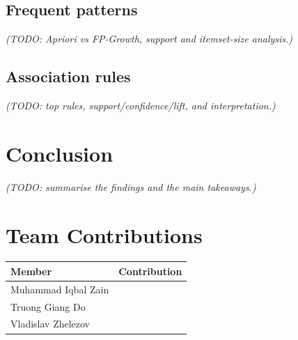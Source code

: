 \documentclass[11pt,a4paper]{article}
\numberwithin{table}{section}
\numberwithin{figure}{section}
\newcommand{\memberA}{Muhammad Iqbal Zain}
\newcommand{\memberB}{Truong Giang Do}
\newcommand{\memberC}{Vladislav Zhelezov}
\begin{document}
\subsection{Frequent patterns}
\emph{(TODO: Apriori vs FP-Growth, support and itemset-size analysis.)}

\subsection{Association rules}
\emph{(TODO: top rules, support/confidence/lift, and interpretation.)}

\section{Conclusion}
\label{sec:conclusion}
\emph{(TODO: summarise the findings and the main takeaways.)}

\section*{Team Contributions}
\label{sec:contributions}
\begin{table}[h]
  \centering
  \small
  \begin{tabularx}{\columnwidth}{l X}
    \toprule
    Member & Contribution \\
    \midrule
    \memberA & \\
    \memberB & \\
    \memberC & \\
    \bottomrule
  \end{tabularx}
\end{table}
\end{document}
